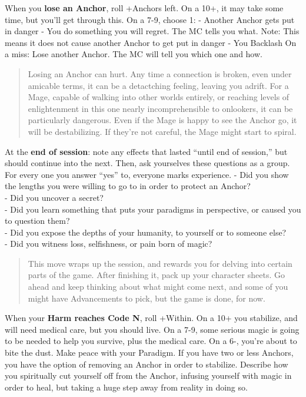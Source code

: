 \documentclass[
  oneside,
  statementpaper,
  9pt]{memoir}
\begin{document}
When you \textbf{lose an Anchor}, roll +Anchors left. On a 10+, it may
take some time, but you'll get through this. On a 7-9, choose 1: -
Another Anchor gets put in danger - You do something you will regret.
The MC tells you what. Note: This means it does not cause another Anchor
to get put in danger - You Backlash On a miss: Lose another Anchor. The
MC will tell you which one and how.

\begin{quote}
Losing an Anchor can hurt. Any time a connection is broken, even under
amicable terms, it can be a detactching feeling, leaving you adrift. For
a Mage, capable of walking into other worlds entirely, or reaching
levels of enlightenment in this one nearly incomprehensible to
onlookers, it can be particularly dangerous. Even if the Mage is happy
to see the Anchor go, it will be destabilizing. If they're not careful,
the Mage might start to spiral.
\end{quote}

At the \textbf{end of session}: note any effects that lasted ``until end
of session,'' but should continue into the next. Then, ask yourselves
these questions as a group. For every one you answer ``yes'' to,
everyone marks experience. - Did you show the lengths you were willing
to go to in order to protect an Anchor?\\
- Did you uncover a secret?\\
- Did you learn something that puts your paradigms in perspective, or
caused you to question them?\\
- Did you expose the depths of your humanity, to yourself or to someone
else?\\
- Did you witness loss, selfishness, or pain born of magic?

\begin{quote}
This move wraps up the session, and rewards you for delving into certain
parts of the game. After finishing it, pack up your character sheets. Go
ahead and keep thinking about what might come next, and some of you
might have Advancements to pick, but the game is done, for now.
\end{quote}

When your \textbf{Harm reaches Code N}, roll +Within. On a 10+ you
stabilize, and will need medical care, but you should live. On a 7-9,
some serious magic is going to be needed to help you survive, plus the
medical care. On a 6-, you're about to bite the dust. Make peace with
your Paradigm. If you have two or less Anchors, you have the option of
removing an Anchor in order to stabilize. Describe how you spiritually
cut yourself off from the Anchor, infusing yourself with magic in order
to heal, but taking a huge step away from reality in doing so.
\end{document}
